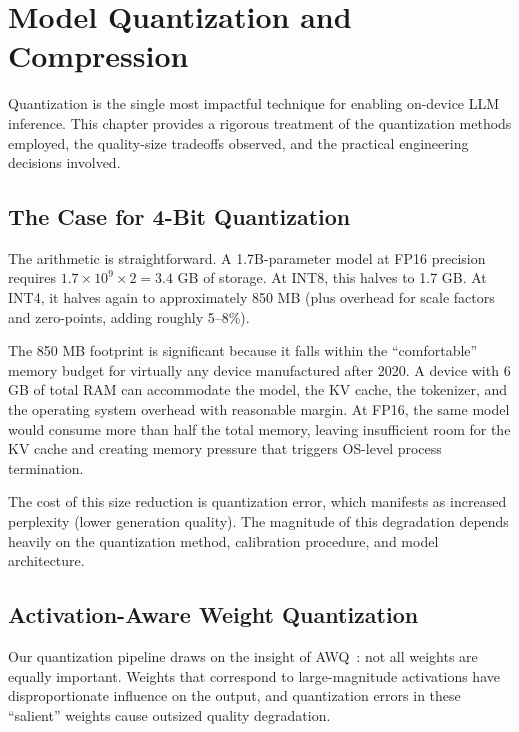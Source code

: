 \documentclass[12pt, letterpaper, twoside]{report}
\begin{document}
\chapter{Model Quantization and Compression}
\label{ch:quantization}

Quantization is the single most impactful technique for enabling on-device LLM inference. This chapter provides a rigorous treatment of the quantization methods employed, the quality-size tradeoffs observed, and the practical engineering decisions involved.

\section{The Case for 4-Bit Quantization}
\label{sec:case_for_4bit}

The arithmetic is straightforward. A 1.7B-parameter model at FP16 precision requires $1.7 \times 10^9 \times 2 = 3.4$ GB of storage. At INT8, this halves to 1.7 GB. At INT4, it halves again to approximately 850 MB (plus overhead for scale factors and zero-points, adding roughly 5--8\%).

The 850 MB footprint is significant because it falls within the ``comfortable'' memory budget for virtually any device manufactured after 2020. A device with 6 GB of total RAM can accommodate the model, the KV cache, the tokenizer, and the operating system overhead with reasonable margin. At FP16, the same model would consume more than half the total memory, leaving insufficient room for the KV cache and creating memory pressure that triggers OS-level process termination.

The cost of this size reduction is quantization error, which manifests as increased perplexity (lower generation quality). The magnitude of this degradation depends heavily on the quantization method, calibration procedure, and model architecture.

\section{Activation-Aware Weight Quantization}
\label{sec:awq}

Our quantization pipeline draws on the insight of AWQ~\cite{lin2024awq}: not all weights are equally important. Weights that correspond to large-magnitude activations have disproportionate influence on the output, and quantization errors in these ``salient'' weights cause outsized quality degradation.
\end{document}
